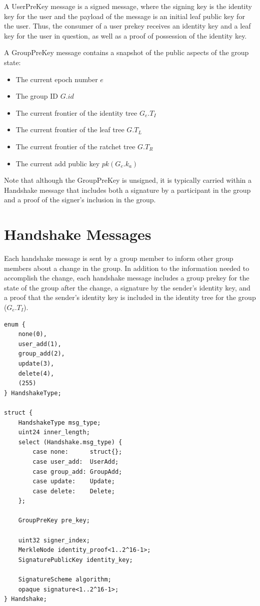 \documentclass[11pt, oneside]{article}
\begin{document}
A UserPreKey message is a signed message, where the signing key is the identity key for the user and the payload of the message is an initial leaf public key for the user.  Thus, the consumer of a user prekey receives an identity key and a leaf key for the user in question, as well as a proof of possession of the identity key.

A GroupPreKey message contains a snapshot of the public aspects of the group state:

\begin{itemize}
\item{The current epoch number $e$}
\item{The group ID $G.id$}
\item{The current frontier of the identity tree $G_e.T_I$}
\item{The current frontier of the leaf tree $G.T_L$}
\item{The current frontier of the ratchet tree $G.T_R$}
\item{The current add public key $pk(G_e.k_a)$}
\end{itemize}

Note that although the GroupPreKey is unsigned, it is typically carried within a Handshake message that includes both a signature by a participant in the group and a proof of the signer's inclusion in the group.


\section{Handshake Messages}

Each handshake message is sent by a group member to inform other group members about a change in the group.  In addition to the information needed to accomplish the change, each handshake message includes a group prekey for the state of the group after the change, a signature by the sender's identity key, and a proof that the sender's identity key is included in the identity tree for the group ($G_e.T_I$).

\begin{verbatim}
enum {
    none(0), 
    user_add(1), 
    group_add(2),
    update(3),
    delete(4),
    (255)
} HandshakeType;

struct {
    HandshakeType msg_type;
    uint24 inner_length;
    select (Handshake.msg_type) {
        case none:      struct{};
        case user_add:  UserAdd;
        case group_add: GroupAdd;
        case update:    Update;
        case delete:    Delete;
    };

    GroupPreKey pre_key;

    uint32 signer_index;
    MerkleNode identity_proof<1..2^16-1>;
    SignaturePublicKey identity_key;

    SignatureScheme algorithm;
    opaque signature<1..2^16-1>;
} Handshake;
\end{verbatim}
\end{document}
